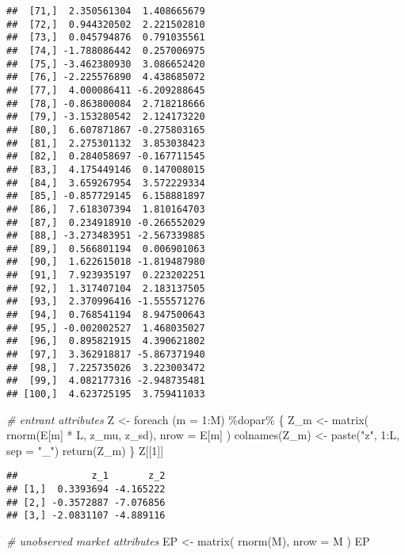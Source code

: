 \documentclass[
]{article}
\newenvironment{Shaded}{\begin{snugshade}}{\end{snugshade}}
\newcommand{\AttributeTok}[1]{\textcolor[rgb]{0.77,0.63,0.00}{#1}}
\newcommand{\CommentTok}[1]{\textcolor[rgb]{0.56,0.35,0.01}{\textit{#1}}}
\newcommand{\DecValTok}[1]{\textcolor[rgb]{0.00,0.00,0.81}{#1}}
\newcommand{\FunctionTok}[1]{\textcolor[rgb]{0.00,0.00,0.00}{#1}}
\newcommand{\NormalTok}[1]{#1}
\newcommand{\OtherTok}[1]{\textcolor[rgb]{0.56,0.35,0.01}{#1}}
\newcommand{\SpecialCharTok}[1]{\textcolor[rgb]{0.00,0.00,0.00}{#1}}
\newcommand{\StringTok}[1]{\textcolor[rgb]{0.31,0.60,0.02}{#1}}
\begin{document}
\begin{verbatim}
##  [71,]  2.350561304  1.408665679
##  [72,]  0.944320502  2.221502810
##  [73,]  0.045794876  0.791035561
##  [74,] -1.788086442  0.257006975
##  [75,] -3.462380930  3.086652420
##  [76,] -2.225576890  4.438685072
##  [77,]  4.000086411 -6.209288645
##  [78,] -0.863800084  2.718218666
##  [79,] -3.153280542  2.124173220
##  [80,]  6.607871867 -0.275803165
##  [81,]  2.275301132  3.853038423
##  [82,]  0.284058697 -0.167711545
##  [83,]  4.175449146  0.147008015
##  [84,]  3.659267954  3.572229334
##  [85,] -0.857729145  6.158881897
##  [86,]  7.618307394  1.810164703
##  [87,]  0.234918910 -0.266552029
##  [88,] -3.273483951 -2.567339885
##  [89,]  0.566801194  0.006901063
##  [90,]  1.622615018 -1.819487980
##  [91,]  7.923935197  0.223202251
##  [92,]  1.317407104  2.183137505
##  [93,]  2.370996416 -1.555571276
##  [94,]  0.768541194  8.947500643
##  [95,] -0.002002527  1.468035027
##  [96,]  0.895821915  4.390621802
##  [97,]  3.362918817 -5.867371940
##  [98,]  7.225735026  3.223003472
##  [99,]  4.082177316 -2.948735481
## [100,]  4.623725195  3.759411033
\end{verbatim}

\begin{Shaded}
\begin{Highlighting}[]
\CommentTok{\# entrant attributes}
\NormalTok{Z }\OtherTok{\textless{}{-}}
  \FunctionTok{foreach}\NormalTok{ (}\AttributeTok{m =} \DecValTok{1}\SpecialCharTok{:}\NormalTok{M) }\SpecialCharTok{\%dopar\%}\NormalTok{ \{}
\NormalTok{    Z\_m }\OtherTok{\textless{}{-}} \FunctionTok{matrix}\NormalTok{(}
      \FunctionTok{rnorm}\NormalTok{(E[m] }\SpecialCharTok{*}\NormalTok{ L, z\_mu, z\_sd),}
      \AttributeTok{nrow =}\NormalTok{ E[m]}
\NormalTok{    )}
    \FunctionTok{colnames}\NormalTok{(Z\_m) }\OtherTok{\textless{}{-}} \FunctionTok{paste}\NormalTok{(}\StringTok{"z"}\NormalTok{, }\DecValTok{1}\SpecialCharTok{:}\NormalTok{L, }\AttributeTok{sep =} \StringTok{"\_"}\NormalTok{)}
    \FunctionTok{return}\NormalTok{(Z\_m)}
\NormalTok{  \}}
\NormalTok{Z[[}\DecValTok{1}\NormalTok{]]}
\end{Highlighting}
\end{Shaded}

\begin{verbatim}
##             z_1       z_2
## [1,]  0.3393694 -4.165222
## [2,] -0.3572887 -7.076856
## [3,] -2.0831107 -4.889116
\end{verbatim}

\begin{Shaded}
\begin{Highlighting}[]
\CommentTok{\# unobserved market attributes}
\NormalTok{EP }\OtherTok{\textless{}{-}} \FunctionTok{matrix}\NormalTok{(}
  \FunctionTok{rnorm}\NormalTok{(M),}
  \AttributeTok{nrow =}\NormalTok{ M}
\NormalTok{)}
\NormalTok{EP}
\end{Highlighting}
\end{Shaded}
\end{document}
